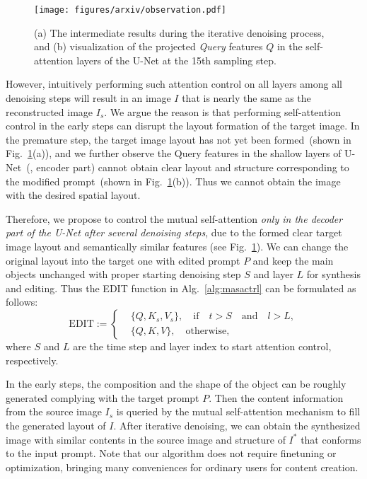 \documentclass[10pt,twocolumn,letterpaper]{article}
\begin{document}
\begin{figure}[th]
    \centering
    \texttt{[image: figures/arxiv/observation.pdf]}
    \caption{(a) The intermediate results during the iterative denoising process, and (b) visualization of the projected \textit{Query} features $Q$ in the self-attention layers of the U-Net at the 15th sampling step.}
    \label{fig:intermediate_vis}
\end{figure}


However, intuitively performing such attention control on all layers among all denoising steps will result in an image $I$ that is nearly the same as the reconstructed image $I_s$. We argue the reason is that performing self-attention control in the early steps can disrupt the layout formation of the target image. In the premature step, the target image layout has not yet been formed~(shown in Fig.~\ref{fig:intermediate_vis}(a)), and we further observe the Query features in the shallow layers of U-Net~(\eg, encoder part) cannot obtain clear layout and structure corresponding to the modified prompt~(shown in Fig.~\ref{fig:intermediate_vis}(b)). Thus we cannot obtain the image with the desired spatial layout.

Therefore, we propose to control the mutual self-attention \textit{only in the decoder part of the U-Net after several denoising steps}, due to the formed clear target image layout and semantically similar features (see Fig.~\ref{fig:intermediate_vis}). We can change the original layout into the target one with edited prompt $P$ and keep the main objects unchanged with proper starting denoising step $S$ and layer $L$ for synthesis and editing. Thus the EDIT function in Alg.~\ref{alg:masactrl} can be formulated as follows:
\begin{equation}
    \label{eq:masactrl_edit}
    \text{EDIT} := \left \{
    \begin{aligned}
        & \{Q, K_s, V_s\},\quad \text{if}\quad t > S \quad \text{and} \quad l > L, \\
        & \{Q, K, V\},\quad \text{otherwise},
    \end{aligned}
    \right.
\end{equation}
where $S$ and $L$ are the time step and layer index to start attention control, respectively. 

In the early steps, the composition and the shape of the object can be roughly generated complying with the target prompt $P$. Then the content information from the source image $I_s$ is queried by the mutual self-attention mechanism to fill the generated layout of $I$. After iterative denoising, we can obtain the synthesized image with similar contents in the source image and structure of $I^*$ that conforms to the input prompt. Note that our algorithm does not require finetuning or optimization, bringing many conveniences for ordinary users for content creation.
\end{document}
